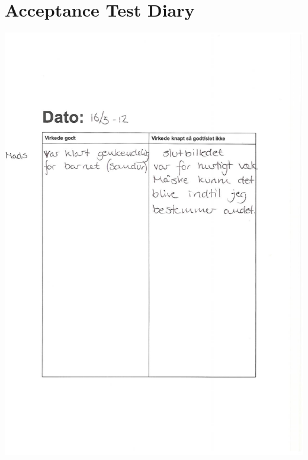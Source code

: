 	\section{Acceptance Test Diary}
	\label{sec:acceptance}
	\begin{center}
		\includegraphics[width=\textwidth]{Development/Acceptance_diary/Diary_1.pdf}

\end{center}
